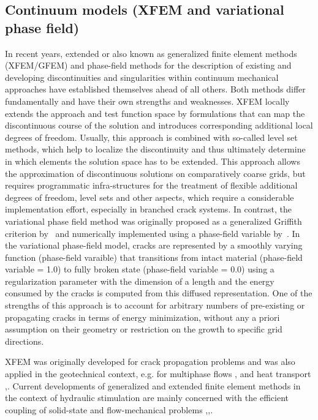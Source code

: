 \subsection{Continuum models (XFEM and variational phase field)}

In recent years, extended \cite{Belytschko1999601} or also known as generalized \cite{Strouboulis200043}  finite element methods (XFEM/GFEM) and phase-field methods \cite{Bourdin2000797} for the description of existing and developing discontinuities and singularities within continuum mechanical approaches have established themselves ahead of all others. 
Both methods differ fundamentally and have their own strengths and weaknesses. 
XFEM locally extends the approach and test function space by formulations that can map the discontinuous course of the solution and introduces corresponding additional local degrees of freedom. 
Usually, this approach is combined with so-called level set methods, which help to localize the discontinuity and thus ultimately determine in which elements the solution space has to be extended. 
This approach allows the approximation of discontinuous solutions on comparatively coarse grids, but requires programmatic infra-structures for the treatment of flexible additional degrees of freedom, level sets and other aspects, which require a considerable implementation effort, especially in branched crack systems. 
In contrast, the variational phase field method was originally proposed as a generalized Griffith criterion by~\cite{Francfort1998} and numerically implemented using a phase-field variable by~\cite{Bourdin2000}.
In the variational phase-field model, cracks are represented by a smoothly varying function (phase-field varaible) that transitions from intact material (phase-field variable = 1.0) to fully broken state (phase-field variable = 0.0) using a regularization parameter with the dimension of a length and the energy consumed by the cracks is computed from this diffused representation. 
One of the strengths of this approach is to account for arbitrary numbers of pre-existing or propagating cracks in terms of energy minimization, without any a priori assumption on their geometry or restriction on the growth to specific grid directions.

XFEM \cite{Belytschko1999601} was originally developed for crack propagation problems and was also applied in the geotechnical context, e.g. for multiphase flows \cite{Chessa200310},\cite{Mohammadnejad2013327} and heat transport \cite{Khoei2012701},\cite{Shao2014155}. Current developments of generalized and extended finite element methods in the context of hydraulic stimulation are mainly concerned with the efficient coupling of solid-state and flow-mechanical problems \cite{Yazid20094269},\cite{Watanabe20121010},\cite{Meschke2015438}.

